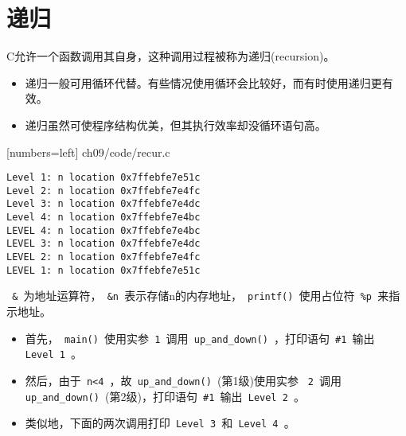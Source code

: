\section{递归}

\begin{frame}[fragile]\ft{\secname}
C允许一个函数调用其自身，这种调用过程被称为递归(recursion)。 
\vspace{0.1in}

\begin{itemize}
\item 递归一般可用循环代替。有些情况使用循环会比较好，而有时使用递归更有效。\\[0.1in]
\item 递归虽然可使程序结构优美，但其执行效率却没循环语句高。
\end{itemize}
\end{frame}


\begin{frame}\ft{\secname}
  
  [numbers=left]
  {ch09/code/recur.c}
\end{frame}


\begin{frame}[fragile]\ft{\secname}
\begin{lstlisting}[backgroundcolor=\color{red!10}]
Level 1: n location 0x7ffebfe7e51c
Level 2: n location 0x7ffebfe7e4fc
Level 3: n location 0x7ffebfe7e4dc
Level 4: n location 0x7ffebfe7e4bc
LEVEL 4: n location 0x7ffebfe7e4bc
LEVEL 3: n location 0x7ffebfe7e4dc
LEVEL 2: n location 0x7ffebfe7e4fc
LEVEL 1: n location 0x7ffebfe7e51c
\end{lstlisting}
\end{frame}


\begin{frame}[fragile]\ft{\secname}
\lstinline| & |为地址运算符，\lstinline| &n |表示存储n的内存地址，\lstinline| printf() |使用占位符\lstinline| %p |来指示地址。
\end{frame}


\begin{frame}[fragile]
\begin{itemize}
\item 首先，\lstinline| main() |使用实参\lstinline| 1 |调用\lstinline| up_and_down() |，打印语句\lstinline| #1 |输出\lstinline| Level 1 |。\\[0.1in]
\item 然后，由于\lstinline| n<4 |，故\lstinline| up_and_down() |(第1级)使用实参 \lstinline| 2 |调用\lstinline| up_and_down() |(第2级)，打印语句\lstinline| #1 |输出\lstinline| Level 2 |。\\[0.1in]
\item 类似地，下面的两次调用打印\lstinline| Level 3 |和\lstinline| Level 4 |。
\end{itemize}
\end{frame}

